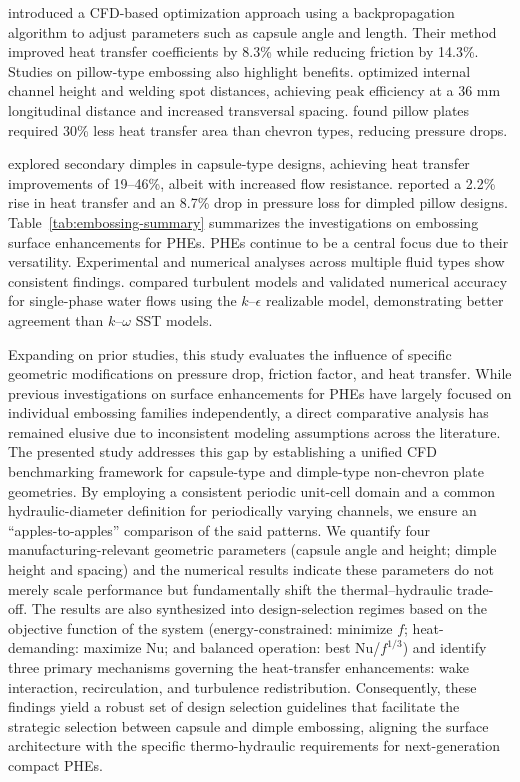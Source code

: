 \documentclass[review,12pt]{elsarticle}
\begin{document}
\citet{yu2024} introduced a CFD-based optimization approach using a backpropagation algorithm to adjust parameters such as capsule angle and length. Their method improved heat transfer coefficients by 8.3\% while reducing friction by 14.3\%. Studies on pillow-type embossing also highlight benefits. \citet{shirzad2019a} optimized internal channel height and welding spot distances, achieving peak efficiency at a 36 mm longitudinal distance and increased transversal spacing. \citet{arsenyeva2019} found pillow plates required 30\% less heat transfer area than chevron types, reducing pressure drops.

\citet{shao2024} explored secondary dimples in capsule-type designs, achieving heat transfer improvements of 19--46\%, albeit with increased flow resistance. \citet{piper2019} reported a 2.2\% rise in heat transfer and an 8.7\% drop in pressure loss for dimpled pillow designs. Table~\ref{tab:embossing-summary} summarizes the investigations on embossing surface enhancements for PHEs. PHEs continue to be a central focus due to their versatility. Experimental and numerical analyses across multiple fluid types show consistent findings. \citet{mocnik2020, mocnik2023, mocnik2024} compared turbulent models and validated numerical accuracy for single-phase water flows using the $k$--$\epsilon$ realizable model, demonstrating better agreement than $k$--$\omega$ SST models.

Expanding on prior studies, this study evaluates the influence of specific geometric modifications on pressure drop, friction factor, and heat transfer. While previous investigations on surface enhancements for PHEs have largely focused on individual embossing families independently, a direct comparative analysis has remained elusive due to inconsistent modeling assumptions across the literature. The presented study addresses this gap by establishing a unified CFD benchmarking framework for capsule-type and dimple-type non-chevron plate geometries. By employing a consistent periodic unit-cell domain and a common hydraulic-diameter definition for periodically varying channels, we ensure an ``apples-to-apples'' comparison of the said patterns. We quantify four manufacturing-relevant geometric parameters (capsule angle and height; dimple height and spacing) and the numerical results indicate these parameters do not merely scale performance but fundamentally shift the thermal--hydraulic trade-off. The results are also synthesized into design-selection regimes based on the objective function of the system (energy-constrained: minimize $f$; heat-demanding: maximize Nu; and balanced operation: best Nu/$f^{1/3}$) and identify three primary mechanisms governing the heat-transfer enhancements: wake interaction, recirculation, and turbulence redistribution. Consequently, these findings yield a robust set of design selection guidelines that facilitate the strategic selection between capsule and dimple embossing, aligning the surface architecture with the specific thermo-hydraulic requirements for next-generation compact PHEs.
\end{document}
